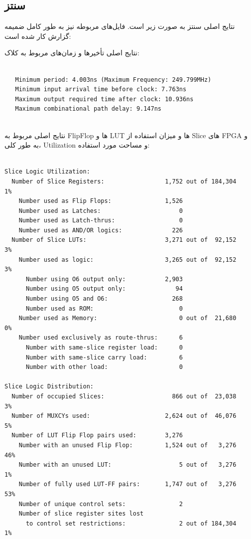\documentclass[12pt,titlepage,a4page , tikz , multi,table , svgnames,xcdraw]{article}
\begin{document}
\subsection{سنتز }

نتایج اصلی سنتز به صورت زیر است. فایل‌های مربوطه نیز به طور کامل ضمیمه گزارش کار شده است:

نتایج اصلی تأخیرها و زمان‌های مربوط به کلاک:

\begin{latin}
\begin{verbatim}

   Minimum period: 4.003ns (Maximum Frequency: 249.799MHz)
   Minimum input arrival time before clock: 7.763ns
   Maximum output required time after clock: 10.936ns
   Maximum combinational path delay: 9.147ns


\end{verbatim}
\end{latin}


نتایج اصلی مربوط به FlipFlop ها و LUT ها و میزان استفاده از Slice های FPGA و به طور کلی، Utilization و مساحت مورد استفاده:

\begin{latin}
\begin{verbatim}

Slice Logic Utilization:
  Number of Slice Registers:                 1,752 out of 184,304    1%
    Number used as Flip Flops:               1,526
    Number used as Latches:                      0
    Number used as Latch-thrus:                  0
    Number used as AND/OR logics:              226
  Number of Slice LUTs:                      3,271 out of  92,152    3%
    Number used as logic:                    3,265 out of  92,152    3%
      Number using O6 output only:           2,903
      Number using O5 output only:              94
      Number using O5 and O6:                  268
      Number used as ROM:                        0
    Number used as Memory:                       0 out of  21,680    0%
    Number used exclusively as route-thrus:      6
      Number with same-slice register load:      0
      Number with same-slice carry load:         6
      Number with other load:                    0

Slice Logic Distribution:
  Number of occupied Slices:                   866 out of  23,038    3%
  Number of MUXCYs used:                     2,624 out of  46,076    5%
  Number of LUT Flip Flop pairs used:        3,276
    Number with an unused Flip Flop:         1,524 out of   3,276   46%
    Number with an unused LUT:                   5 out of   3,276    1%
    Number of fully used LUT-FF pairs:       1,747 out of   3,276   53%
    Number of unique control sets:               2
    Number of slice register sites lost
      to control set restrictions:               2 out of 184,304    1%


\end{verbatim}
\end{latin}



\newpage
\medskip




\end{document}
